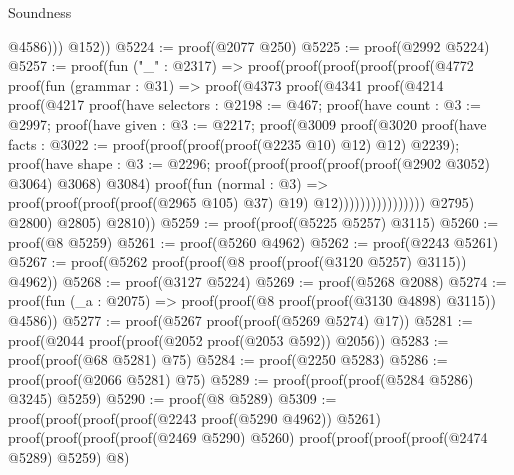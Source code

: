 \begin{lexlean}{Soundness}
\begin{coremodule}
                  @4586)))
          @152))
@5224 := proof(@2077 @250)
@5225 := proof(@2992 @5224)
@5257 := proof(fun ("_" : @2317) =>
    proof(proof(proof(proof(proof(@4772
                proof(fun (grammar : @31) =>
                  proof(@4373
                      proof(@4341
                          proof(@4214
                              proof(@4217
                                  proof(have selectors : @2198 := @467;
                                    proof(have count : @3 := @2997;
                                      proof(have given : @3 := @2217;
                                        proof(@3009
                                            proof(@3020
                                                proof(have facts : @3022 := proof(proof(proof(proof(@2235
                                                            @10)
                                                          @12)
                                                        @12)
                                                      @2239);
                                                  proof(have shape : @3 := @2296;
                                                    proof(proof(proof(proof(proof(@2902 @3052)
                                                              @3064)
                                                            @3068)
                                                          @3084)
                                                        proof(fun (normal : @3) =>
                                                          proof(proof(proof(proof(@2965 @105) @37)
                                                                @19)
                                                              @12))))))))))))))))
              @2795)
            @2800)
          @2805)
        @2810))
@5259 := proof(proof(@5225 @5257) @3115)
@5260 := proof(@8 @5259)
@5261 := proof(@5260 @4962)
@5262 := proof(@2243 @5261)
@5267 := proof(@5262 proof(proof(@8 proof(proof(@3120 @5257) @3115)) @4962))
@5268 := proof(@3127 @5224)
@5269 := proof(@5268 @2088)
@5274 := proof(fun (_a : @2075) => proof(proof(@8 proof(proof(@3130 @4898) @3115)) @4586))
@5277 := proof(@5267 proof(proof(@5269 @5274) @17))
@5281 := proof(@2044 proof(proof(@2052 proof(@2053 @592)) @2056))
@5283 := proof(proof(@68 @5281) @75)
@5284 := proof(@2250 @5283)
@5286 := proof(proof(@2066 @5281) @75)
@5289 := proof(proof(proof(@5284 @5286) @3245) @5259)
@5290 := proof(@8 @5289)
@5309 := proof(proof(proof(proof(@2243 proof(@5290 @4962)) @5261)
        proof(proof(proof(proof(@2469 @5290) @5260)
              proof(proof(proof(proof(@2474 @5289) @5259) @8)

\end{coremodule}
\end{lexlean}
